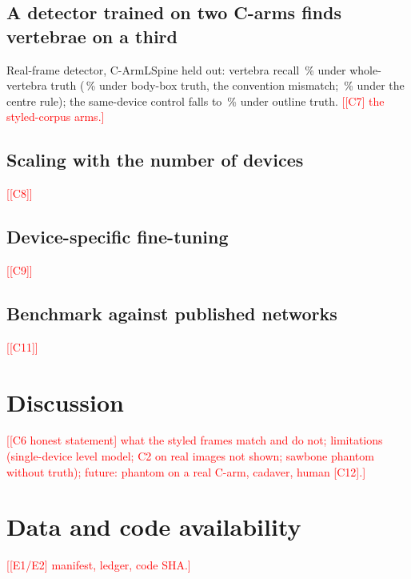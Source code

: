 \documentclass[11pt]{article}
\newcommand{\todo}[1]{\textcolor{red}{[#1]}}
\begin{document}
\subsection{A detector trained on two C-arms finds vertebrae on a third}
Real-frame detector, C-ArmLSpine held out: vertebra recall \clLodoCarmHeldoutVertOutlineZeroTwoFive\,\% under whole-vertebra truth (\clLodoCarmHeldoutVertBodyZeroTwoFive\,\% under body-box truth, the convention mismatch; \clLodoCarmHeldoutVertCentreZeroTwoFive\,\% under the centre rule); the same-device control falls to \clPooledCarmVertOutlineZeroTwoFiveControl\,\% under outline truth. \todo{[C7] the styled-corpus arms.}
\subsection{Scaling with the number of devices}
\todo{[C8]}
\subsection{Device-specific fine-tuning}
\todo{[C9]}
\subsection{Benchmark against published networks}
\todo{[C11]}

\section{Discussion}
\todo{[C6 honest statement] what the styled frames match and do not; limitations (single-device level model; C2 on real images not shown; sawbone phantom without truth); future: phantom on a real C-arm, cadaver, human [C12].}

\section*{Data and code availability}
\todo{[E1/E2] manifest, ledger, code SHA.}
\end{document}
